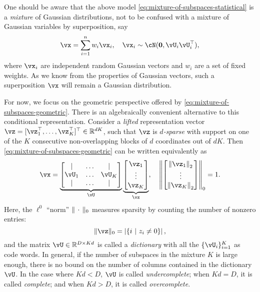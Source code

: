 \documentclass[../../book-main.tex]{subfiles}
\begin{document}
\begin{remark}
One should be aware that the above model
    \eqref{eq:mixture-of-subspaces-statistical} is a \textit{mixture} of
    Gaussian distributions, not to be confused with a mixture of Gaussian
    variables by superposition, say 
\begin{equation}
    \vx = \sum_{i=1}^n w_i \vx_i, \quad \vx_i \sim \cN(\mathbf{0}, \vU_i\vU_i^\top),
\end{equation}
where $\vx_i$ are independent random Gaussian vectors and $w_i$ are a set of fixed weights. As we know from the properties of Gaussian vectors, such a superposition $\vx$ will remain a Gaussian distribution.
\end{remark}

For now, we focus on the geometric perspective offered by \eqref{eq:mixture-of-subspaces-geometric}.
There is an algebraically convenient alternative to this conditional representation. Consider a \textit{lifted} representation vector $\vz = [\vz_1^\top, \dots, \vz_K^\top]^\top \in \R^{dK}$, such that $\vz$ is \textit{$d$-sparse} with support on one of the $K$ consecutive non-overlapping blocks of $d$ coordinates out of $dK$. 
Then \eqref{eq:mixture-of-subspaces-geometric} can be written equivalently as
\begin{equation}\label{eq:mixture-of-subspaces-dictionary-pre}
    \vx = 
    \underbrace{
    \begin{bmatrix} 
    | & \hdots & |  \\
    \vU_1 & \hdots & \vU_K  \\
    | & \hdots & | 
    \end{bmatrix} 
    }_{\vU}
    \underbrace{
    \begin{bmatrix} \vz_1 \\ \vdots \\ \vz_K \end{bmatrix}
    }_{\vz},
    \quad
    \norm*{
    \begin{bmatrix} \norm*{\vz_1}_2 \\ \vdots \\ \norm*{\vz_K}_2 \end{bmatrix}
    }_0 = 1.
\end{equation}
Here, the $\ell^0$ ``norm'' $\norm{\,\cdot\,}_0$ measures sparsity by counting the number of nonzero entries:
\begin{equation}\label{eq:ell-zero-norm}
    \norm{\vz}_0 = \abs*{\set{i \given z_i \neq 0}},
\end{equation}
and the matrix $\vU \in \R^{D \times Kd}$ is called a \textit{dictionary} with all the $\{\vU_i\}_{i=1}^K$ as code words. In general, if the number of subspaces in the mixture $K$ is large enough, there is no bound on the number of columns contained in the dictionary $\vU$. In the case where $Kd < D$, $\vU$ is called \textit{undercomplete};
when $Kd = D$, it is called \textit{complete}; and when $Kd > D$, it is called \textit{overcomplete}. 
\end{document}
